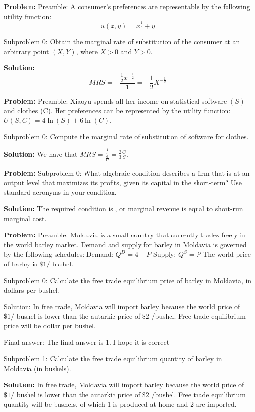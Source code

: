 \documentclass[10pt]{article}
\begin{document}
\textbf{Problem:}
Preamble: A consumer's preferences are representable by the following utility function:
\[
  u(x, y)=x^{\frac{1}{2}}+y
\]

Subproblem 0: Obtain the marginal rate of substitution of the consumer at an arbitrary point $(X,Y)$, where $X>0$ and $Y>0$.


\textbf{Solution:}
\[ M R S=-\frac{\frac{1}{2} x^{-\frac{1}{2}}}{1}=\boxed{-\frac{1}{2} X^{-\frac{1}{2}}} \]


\textbf{Problem:}
Preamble: Xiaoyu spends all her income on statistical software $(S)$ and clothes (C). Her preferences can be represented by the utility function: $U(S, C)=4 \ln (S)+6 \ln (C)$.

Subproblem 0: Compute the marginal rate of substitution of software for clothes.


\textbf{Solution:}
We have that $M R S=\frac{\frac{4}{S}}{\frac{6}{C}}=\boxed{\frac{2}{3} \frac{C}{S}}$. 


\textbf{Problem:}
Subproblem 0: What algebraic condition describes a firm that is at an output level that maximizes its profits, given its capital in the short-term?  Use standard acronyms in your condition.


\textbf{Solution:}
The required condition is , or marginal revenue is equal to short-run marginal cost.


\textbf{Problem:}
Preamble: Moldavia is a small country that currently trades freely in the world barley market. Demand and supply for barley in Moldavia is governed by the following schedules:
Demand: $Q^{D}=4-P$
Supply: $Q^{S}=P$
The world price of barley is $\$ 1 /$ bushel.

Subproblem 0: Calculate the free trade equilibrium price of barley in Moldavia, in dollars per bushel. 


Solution: In free trade, Moldavia will import barley because the world price of $\$ 1 /$ bushel is lower than the autarkic price of $\$ 2$ /bushel. Free trade equilibrium price will be  dollar per bushel.

Final answer: The final answer is 1. I hope it is correct.

Subproblem 1: Calculate the free trade equilibrium quantity of barley in Moldavia (in bushels). 


\textbf{Solution:}
In free trade, Moldavia will import barley because the world price of $\$ 1 /$ bushel is lower than the autarkic price of $\$ 2$ /bushel. Free trade equilibrium quantity will be  bushels, of which 1 is produced at home and 2 are imported. 
\end{document}
